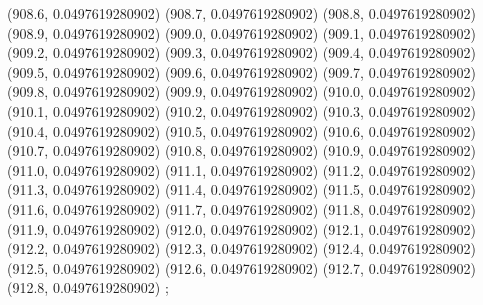 {					(908.6, 0.0497619280902)
					(908.7, 0.0497619280902)
					(908.8, 0.0497619280902)
					(908.9, 0.0497619280902)
					(909.0, 0.0497619280902)
					(909.1, 0.0497619280902)
					(909.2, 0.0497619280902)
					(909.3, 0.0497619280902)
					(909.4, 0.0497619280902)
					(909.5, 0.0497619280902)
					(909.6, 0.0497619280902)
					(909.7, 0.0497619280902)
					(909.8, 0.0497619280902)
					(909.9, 0.0497619280902)
					(910.0, 0.0497619280902)
					(910.1, 0.0497619280902)
					(910.2, 0.0497619280902)
					(910.3, 0.0497619280902)
					(910.4, 0.0497619280902)
					(910.5, 0.0497619280902)
					(910.6, 0.0497619280902)
					(910.7, 0.0497619280902)
					(910.8, 0.0497619280902)
					(910.9, 0.0497619280902)
					(911.0, 0.0497619280902)
					(911.1, 0.0497619280902)
					(911.2, 0.0497619280902)
					(911.3, 0.0497619280902)
					(911.4, 0.0497619280902)
					(911.5, 0.0497619280902)
					(911.6, 0.0497619280902)
					(911.7, 0.0497619280902)
					(911.8, 0.0497619280902)
					(911.9, 0.0497619280902)
					(912.0, 0.0497619280902)
					(912.1, 0.0497619280902)
					(912.2, 0.0497619280902)
					(912.3, 0.0497619280902)
					(912.4, 0.0497619280902)
					(912.5, 0.0497619280902)
					(912.6, 0.0497619280902)
					(912.7, 0.0497619280902)
					(912.8, 0.0497619280902)
				};

